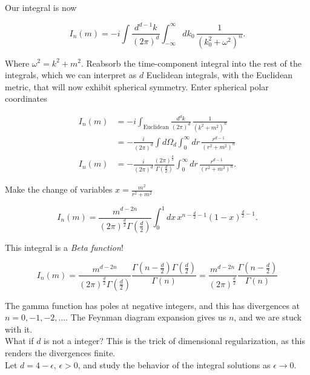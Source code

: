 \documentclass[10pt]{article}
\begin{document}
\noindent Our integral is now

\begin{equation}
I_n(m) = -i \int \frac{d^{d-1} k}{(2 \pi)^d} \int^\infty_{-\infty} dk_0 \, \frac{1}{(k_0^2  + \omega^2)^n}.
\end{equation}

\noindent Where $\omega^2 = k^2 + m^2$. Reabsorb the time-component integral into the rest of the integrals, which we can interpret as $d$ Euclidean integrals, with the Euclidean metric, that will now exhibit spherical symmetry. Enter spherical polar coordinates

\begin{align}
I_n(m) &= -i \int_{\text{Euclidean}} \frac{d^d k}{(2 \pi)^d} \, \frac{1}{(k^2 + m^2)^n} \\
&= -\frac{i}{(2\pi)^d} \int d\Omega_d \int^\infty_0 dr \, \frac{r^{d-1}}{(r^2 + m^2)^n} \\
I_n(m) &= -\frac{i}{(2\pi)^d} \frac{(2\pi)^{\frac{d}{2}}}{\Gamma(\frac{d}{2})} \int^\infty_0 dr \, \frac{r^{d-1}}{(r^2 + m^2)^n} .
\end{align}

\noindent Make the change of variables $x = \frac{m^2}{r^2 + m^2}$

\begin{equation}
I_n(m) = \frac{m^{d-2n}}{(2\pi)^{\frac{d}{2}} \Gamma(\frac{d}{2})} \int_0^1 dx \, x^{n-\frac{d}{2}-1} (1-x)^{\frac{d}{2}-1}.
\end{equation}

\noindent This integral is a \textit{Beta function}!

\begin{equation}
I_n(m) = \frac{m^{d-2n}}{(2\pi)^{\frac{d}{2}} \Gamma(\frac{d}{2})}  \frac{\Gamma(n-\frac{d}{2}) \Gamma(\frac{d}{2})}{\Gamma(n)} = \frac{m^{d-2n}}{(2\pi)^{\frac{d}{2}}}  \frac{\Gamma(n-\frac{d}{2})}{\Gamma(n)}
\end{equation}

\noindent The gamma function has poles at negative integers, and this has divergences at $n=0,-1,-2,\dots$. The Feynman diagram expansion gives us $n$, and we are stuck with it. \\

\noindent What if $d$ is not a integer? This is the trick of dimensional regularization, as this renders the divergences finite. \\

\noindent Let $d = 4-\epsilon$, $\epsilon >0$, and study the behavior of the integral solutions as $\epsilon \rightarrow 0$.
\end{document}
